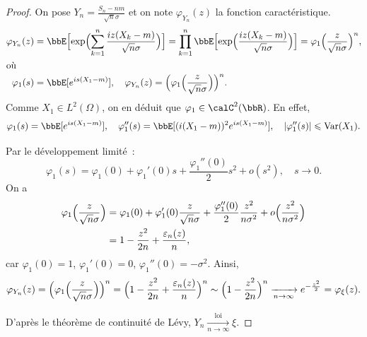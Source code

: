 \begin{proof}
    On pose $Y_n = \frac{S_n - nm}{\sqrt{n} \sigma}$ et on note $\varphi_{Y_n}(z)$ la fonction caractéristique.
    \begin{align*}
        \varphi_{Y_n}(z) & = \bbE\Bigl[\exp\Bigl(\sum_{k = 1}^n \frac{iz(X_k - m)}{\sqrt{n} \sigma}\Bigr)\Bigr]
        = \prod_{k = 1}^n \bbE\Bigl[\exp\Bigl(\frac{iz(X_k - m)}{\sqrt{n} \sigma}\Bigr)\Bigr] = \varphi_1\Bigl(\frac{z}{\sqrt{n} \sigma}\Bigr)^n, \\
        \intertext{où}
        \varphi_1(s)     & = \bbE[e^{is(X_1 - m)}], \quad \varphi_{Y_n}(z) = \Bigl(\varphi_1\Bigl(\frac{z}{\sqrt{n} \sigma}\Bigr)\Bigr)^n.
    \end{align*}
    Comme $X_1 \in L^2(\Omega)$, on en déduit que $\varphi_1 \in \calC^2(\bbR)$.
    En effet,
    \[ \varphi_1(s) = \bbE[e^{is(X_1 - m)}], \quad \varphi_1''(s) = \bbE[(i(X_1 - m))^2 e^{is(X_1 - m)}],
        \quad \lrvert{\varphi_1''(s)} \leqslant \var(X_1). \]

    Par le développement limité~:
    \[ \varphi_1(s) = \varphi_1(0) + \varphi_1'(0)s + \frac{\varphi_1''(0)}{2}s^2 + o(s^2), \quad s \to 0. \]
    On a
    \begin{align*}
        \varphi_1\Bigl(\frac{z}{\sqrt{n} \sigma}\Bigr)
         & = \varphi_1(0) + \varphi_1'(0) \frac{z}{\sqrt{n} \sigma}
        + \frac{\varphi_1''(0)}{2} \frac{z^2}{n \sigma^2} + o\Bigl(\frac{z^2}{n \sigma^2}\Bigr) \\
         & = 1 - \frac{z^2}{2n} + \frac{\varepsilon_n(z)}{n},
    \end{align*}
    car $\varphi_1(0) = 1$, $\varphi_1'(0) = 0$, $\varphi_1''(0) = -\sigma^2$. Ainsi,
    \[ \varphi_{Y_n}(z) = \Bigl(\varphi_1\Bigl(\frac{z}{\sqrt{n} \sigma}\Bigr)\Bigr)^n
        = \Bigl(1 - \frac{z^2}{2n} + \frac{\varepsilon_n(z)}{n}\Bigr)^n
        \sim \Bigl(1 - \frac{z^2}{2n}\Bigr)^n \xrightarrow[n \to \infty]{} e^{-\frac{z^2}{2}} = \varphi_{\xi}(z). \]

    D'après le théorème de continuité de Lévy, $Y_n \xrightarrow[n \to \infty]{\text{loi}} \xi$.
\end{proof}
